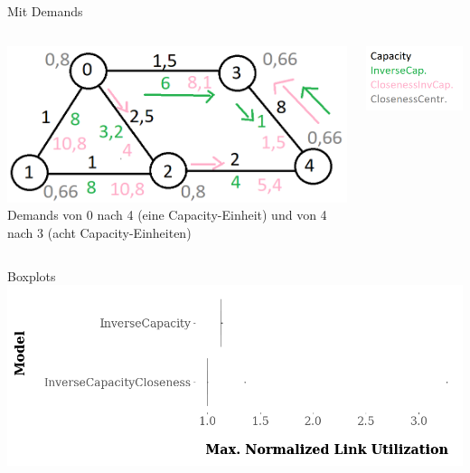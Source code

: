 \documentclass[aspectratio=169,10pt]{beamer}
\begin{document}
\begin{frame}{Mit Demands}
\begin{columns}
\begin{column}[t]{0.7\paperwidth}
\includegraphics[width=\textwidth]{images/kai5.png}
\Large
Demands von 0 nach 4 (eine Capacity-Einheit) und von 4 nach 3 (acht Capacity-Einheiten)
\end{column}
\begin{column}[t]{0.3\paperwidth}
\includegraphics[width=\textwidth]{images/kai_legend.png}
\end{column}
\end{columns}
\end{frame}

\begin{frame}{Boxplots}
\includegraphics[width=\textwidth]{images/kai6.png}
\end{frame}
\end{document}
